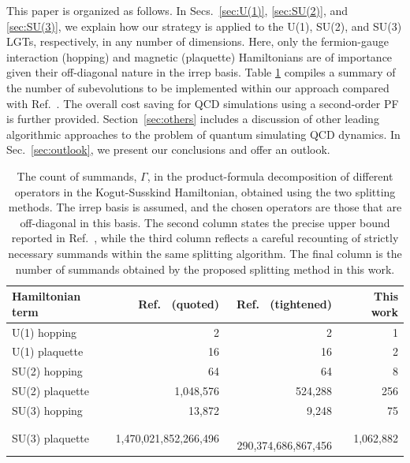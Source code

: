 \documentclass[aps,prd,twocolumn,showpacs,groupedaddress,superscriptaddress,nofootinbib,floatfix,preprintnumbers,longbibliography]{revtex4-1}
\begin{document}
This paper is organized as follows. In Secs.~\ref{sec:U(1)}, \ref{sec:SU(2)}, and \ref{sec:SU(3)}, we explain how our strategy is applied to the U(1), SU(2), and SU(3) LGTs, respectively, in any number of dimensions. Here, only the fermion-gauge interaction (hopping) and magnetic (plaquette) Hamiltonians are of importance given their off-diagonal nature in the irrep basis. Table \ref{tab: summand counts} compiles a summary of the number of subevolutions to be implemented within our approach compared with Ref.~\cite{Kan:2021xfc}. The overall cost saving for QCD simulations using a second-order PF is further provided. Section~\ref{sec:others} includes a discussion of other leading algorithmic approaches to the problem of quantum simulating QCD dynamics. In Sec.~\ref{sec:outlook}, we present our conclusions and offer an outlook.
%
\begin{table}[t!]
    \centering
    \begin{tabular}{l r r r}
          Hamiltonian term & 
          Ref.~\cite{Kan:2021xfc} (quoted) & Ref.~\cite{Kan:2021xfc} (tightened)  & $\ $This work \\
        \hline
        U(1) hopping & 2 & 2 & 1 \\
        U(1) plaquette & 16 & 16 & 2 \\
        SU(2) hopping & 64 & 64 & 8 \\
        SU(2) plaquette & 1,048,576 & 524,288 & 256 \\
        SU(3) hopping & 13,872 & 9,248 & 75 \\
        SU(3) plaquette & 1,470,021,852,266,496 & $\ \ $ 290,374,686,867,456 & 1,062,882
    \end{tabular}
    \caption{The count of summands, $\Gamma$, in the product-formula decomposition of different operators in the Kogut-Susskind Hamiltonian, obtained using the two splitting methods. The irrep basis is assumed, and the chosen operators are those that are off-diagonal in this basis. The second column states the precise upper bound reported in Ref.~\cite{Kan:2021xfc}, while the third column reflects a careful recounting of strictly necessary summands within the same splitting algorithm. The final column is the number of summands obtained by the proposed splitting method in this work.}
    \label{tab: summand counts}
\end{table}
%



\end{document}
